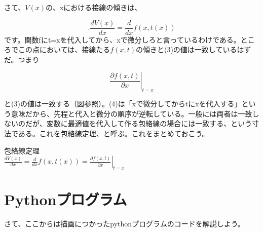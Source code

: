 \documentclass[11pt,a4j,fleqn]{jarticle}
\begin{document}
さて、$V(x)$の、xにおける接線の傾きは、

\begin{equation}
.\frac{dV(x)}{dx} = \frac{d}{dx}f(x,t(x))  
\end{equation}
です。関数fにt=xを代入してから、xで微分しろと言っているわけである。ところでこの点においては、接線たる$f(x,t)$の傾きと(3)の値は一致しているはずだ。つまり

\begin{equation}
\left.\frac{\partial f(x,t)}{\partial x}\right|_{t = x} 
\end{equation}

と(3)の値は一致する（図参照）。(4)は「xで微分してからtにxを代入する」という意味だから、先程と代入と微分の順序が逆転している。一般には両者は一致しないのだが、変数に最適値を代入して作る包絡線の場合には一致する、という寸法である。これを包絡線定理、と呼ぶ。これをまとめておこう。\\

\begin{shadebox}
包絡線定理\\
$ \frac{dV(x)}{dx} = \frac{d}{dx}f(x,t(x)) =\left.\frac{\partial f(x,t)}{\partial x}\right|_{t = x} $

\end{shadebox}

\section{Pythonプログラム}

さて、ここからは描画につかったpythonプログラムのコードを解説しよう。
\end{document}
